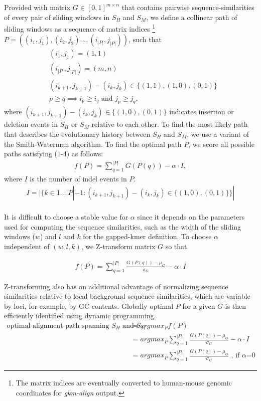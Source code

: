 \documentclass[english]{article}
\begin{document}
Provided with matrix $G\in [0,1]^{m \times n}$ that contains pairwise sequence-similarities of every pair of sliding windows in $S_H$ and $S_M$, we define a collinear path of sliding windows as a sequence of matrix indices \footnote{The matrix indices are eventually converted to human-mouse genomic coordinates for \textit{gkm-align} output.} $P = ((i_1, j_1), (i_2, j_2)\dots, (i_{|P|}, j_{|P|}))$, such that
\begin{align}
    &(i_1, j_1) = (1,1) \\
    &(i_{|P|}, j_{|P|}) = (m,n) \\
    & (i_{k+1}, j_{k+1}) - (i_k, j_k) \in \{(1,1), (1,0), (0,1)\} \\
    & p\geq q \implies i_p \geq i_q \text{ and } j_p \geq j_q,
\end{align}
where $(i_{k+1}, j_{k+1}) - (i_k, j_k) \in \{(1,0), (0,1)\}$ indicates insertion or deletion events in $S_H$ or $S_M$ relative to each other.
To find the most likely path that describes the evolutionary history between $S_H$ and $S_M$, we use a variant of the Smith-Waterman algorithm. To find the optimal path $P$, we score all possible paths satisfying (1-4) as follows:
\begin{align*}
f(P)= \sum_{q=1}^{|P|} G(P(q)) - \alpha \cdot I,
\end{align*}
where $I$ is the number of indel events in $P$.
\begin{align*}
I = |\{k\in 1\dots |P|-1: (i_{k+1},j_{k+1}) - (i_k, j_k) \in \{(1,0),(0,1)\}\}|
\end{align*}
  \\


It is difficult to choose a stable value for $\alpha$ since it depends on the parameters used for computing the sequence similarities, such as the width of the sliding windows ($w$) and $l$ and $k$ for the gapped-kmer definition. To choose $\alpha$ independent of $(w,l,k)$, we Z-transform matrix $G$ so that

 \begin{align*}
f(P)= \sum_{q=1}^{|P|} \frac{G(P(q))-\mu_G}{\sigma_G} - \alpha \cdot I \tag{Eq.8}
\end{align*}

Z-transforming also has an additional advantage of normalizing sequence similarities relative to local background sequence similarities, which are variable by loci, for example, by GC contents. Globally optimal $P$ for a given $G$ is then efficiently identified using dynamic programming. 
\begin{align*}
    \text{optimal alignment path spanning $S_H$ and $S_M$} &= argmax_P f(P) \\
    &=argmax_P \sum_{q=1}^{|P|} \frac{G(P(q))-\mu_G}{\sigma_G} - \alpha \cdot I\\
    &=argmax_P \sum_{q=1}^{|P|} \frac{G(P(q))-\mu_G}{\sigma_G} \text{  , if $\alpha$=0}
\end{align*}
\end{document}
